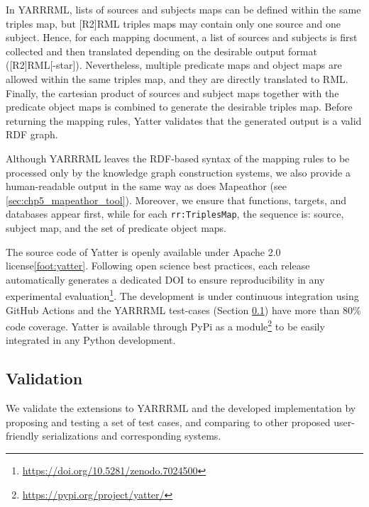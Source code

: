 In YARRRML, lists of sources and subjects maps can be defined within the same triples map, but [R2]RML triples maps may contain only one source and one subject. 
Hence, for each mapping document, a list of sources and subjects is first collected and then translated depending on the desirable output format ([R2]RML[-star]). 
Nevertheless, multiple predicate maps and object maps are allowed within the same triples map, and they are directly translated to RML.
Finally, the cartesian product of sources and subject maps together with the predicate object maps is combined to generate the desirable triples map.
Before returning the mapping rules, Yatter validates that the generated output is a valid RDF graph.



Although YARRRML leaves the RDF-based syntax of the mapping rules to be processed only by the knowledge graph construction systems, we also provide a human-readable output in the same way as does Mapeathor (see \cref{sec:chp5_mapeathor_tool}). 
Moreover, we ensure that functions, targets, and databases appear first, while for each \texttt{rr:TriplesMap}, the sequence is: source, subject map, and the set of predicate object maps.

The source code of Yatter is openly available under Apache 2.0 license\cref{foot:yatter}.
Following open science best practices, each release automatically generates a dedicated DOI to ensure reproducibility in any experimental evaluation\footnote{\url{https://doi.org/10.5281/zenodo.7024500}}. 
The development is under continuous integration using GitHub Actions and the YARRRML test-cases (Section \ref{sec:chp5_yarrrml-validation}) have more than 80\% code coverage. 
Yatter is available through PyPi as a module\footnote{\url{https://pypi.org/project/yatter/}} to be easily integrated in any Python development. %



\subsection{Validation}
\label{sec:chp5_yarrrml-validation}
We validate the extensions to YARRRML and the developed implementation by 
proposing and testing a set of test cases, and comparing to other proposed user-friendly serializations and corresponding systems.

